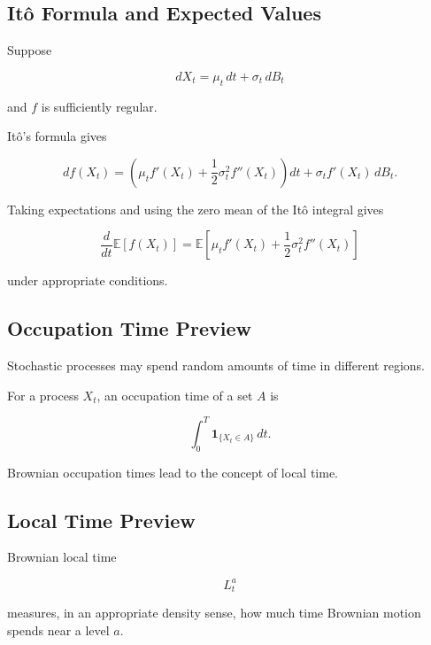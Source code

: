 \subsection{It\^o Formula and Expected Values}
\label{subsec:ito-expected-values}

Suppose

\[
dX_t
=
\mu_t\,dt
+
\sigma_t\,dB_t
\]

and \(f\) is sufficiently regular.

It\^o's formula gives

\[
df(X_t)
=
\left(
\mu_tf'(X_t)
+
\frac12\sigma_t^2f''(X_t)
\right)dt
+
\sigma_tf'(X_t)\,dB_t.
\]

Taking expectations and using the zero mean of the It\^o integral gives

\[
\boxed{
\frac{d}{dt}
\mathbb{E}[f(X_t)]
=
\mathbb{E}
\left[
\mu_tf'(X_t)
+
\frac12\sigma_t^2f''(X_t)
\right]
}
\]

under appropriate conditions.

\subsection{Occupation Time Preview}
\label{subsec:occupation-time-preview}

Stochastic processes may spend random amounts of time in different
regions.

For a process \(X_t\), an occupation time of a set \(A\) is

\[
\boxed{
\int_0^T
\mathbf{1}_{\{X_t\in A\}}
\,dt.
}
\]

Brownian occupation times lead to the concept of local time.

\subsection{Local Time Preview}
\label{subsec:local-time-preview}

Brownian local time

\[
L_t^a
\]

measures, in an appropriate density sense, how much time Brownian motion
spends near a level \(a\).

